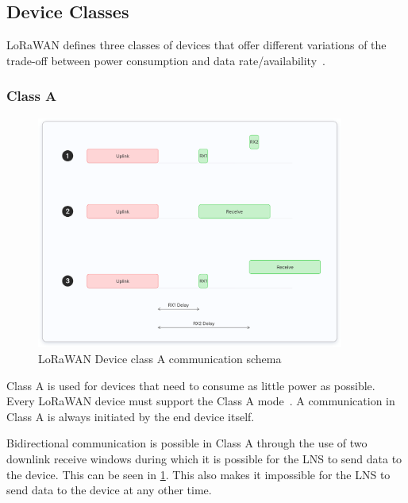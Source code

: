 \subsection{Device Classes}

\ac{LoRaWAN} defines three classes of devices that offer different variations of the trade-off between power consumption and data rate/availability~\cite[p. 10]{lora_alliance_inc_lorawan_2017}.

\subsubsection{Class A}

\begin{figure}[h]
    \centering
    \includegraphics[width=0.9\textwidth]{pictures/device-classes/class-a.png}
    \caption{\ac{LoRaWAN} Device class A communication schema~\protect\cite{the_things_network_device_nodate}}
    \label{pic:lorawan-device-class-a-schema}
\end{figure}

Class A is used for devices that need to consume as little power as possible.
Every \ac{LoRaWAN} device must support the Class A mode~\cite[p. 11]{lora_alliance_inc_lorawan_2017}.
A communication in Class A is always initiated by the end device itself.

Bidirectional communication is possible in Class A through the use of two downlink receive windows during which it is possible for the \ac{LNS} to send data to the device.
This can be seen in \cref{pic:lorawan-device-class-a-schema}.
This also makes it impossible for the \ac{LNS} to send data to the device at any other time.

